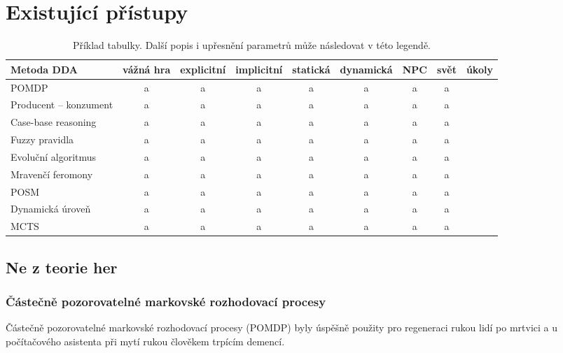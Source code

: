 \chapter{Existující přístupy}

\begin{table*}[t]\footnotesize
\begin{center}
\begin{tabular}{| l || c || c | c || c | c || c | c | c |}
\hline
Metoda DDA & vážná hra & explicitní & implicitní & statická & dynamická & NPC & svět & úkoly \\
\hline
\hline
POMDP & a & a & a & a & a & a & a \\ \hline
Producent – konzument  & a & a & a & a & a & a & a \\ \hline
Case-base reasoning  & a & a & a & a & a & a & a \\ \hline
Fuzzy pravidla  & a & a & a & a & a & a & a \\ \hline
Evoluční algoritmus  & a & a & a & a & a & a & a \\ \hline
Mravenčí feromony  & a & a & a & a & a & a & a \\ \hline
POSM & a & a & a & a & a & a & a \\ \hline
Dynamická úroveň  & a & a & a & a & a & a & a \\ \hline
MCTS  & a & a & a & a & a & a & a \\ \hline
\end{tabular}
\end{center}
\vspace*{0mm}
\caption{{\label{tab:tab1}}Příklad tabulky. Další popis i upřesnění
  parametrů může následovat v této legendě.}
\vspace*{0mm}
\label{shadowtable}
\end{table*}


\section{Ne z teorie her}

\subsection{Částečně pozorovatelné markovské rozhodovací procesy}

Částečně pozorovatelné markovské rozhodovací procesy (POMDP) byly úspěšně použity pro regeneraci rukou lidí po mrtvici \cite{9Pomdp} a u počítačového asistenta při mytí rukou člověkem trpícím demencí.

